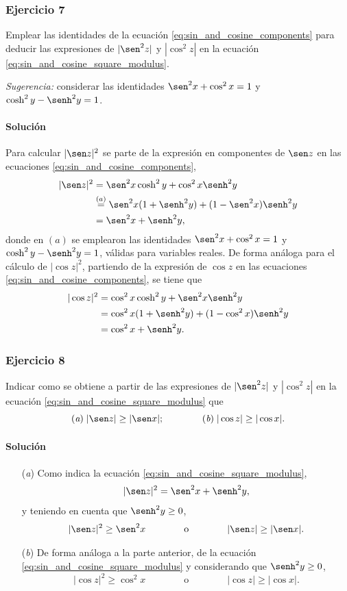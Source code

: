 \documentclass[a4paper]{report}
\begin{document}
\subsubsection{Ejercicio 7}

Emplear las identidades de la ecuación \ref{eq:sin_and_cosine_components} para deducir las expresiones de \(|\sen^2z|\) y \(|\cos^2z|\) en la ecuación \ref{eq:sin_and_cosine_square_modulus}.

\emph{Sugerencia:} considerar las identidades \(\sen^2x+\cos^2x=1\) y \(\cosh^2y-\senh^2y=1\).

\paragraph{Solución} Para calcular \(|\sen z|^2\) se parte de la expresión en componentes de \(\sen z\) en las ecuaciones \ref{eq:sin_and_cosine_components},
\begin{align*}
 |\sen z|^2&=\sen^2x\cosh^2y+\cos^2x\senh^2y\\
  &\overset{(a)}{=}\sen^2x(1+\senh^2y)+(1-\sen^2x)\senh^2y\\
  &=\sen^2x+\senh^2y,
\end{align*}
donde en \((a)\) se emplearon las identidades \(\sen^2x+\cos^2x=1\) y \(\cosh^2y-\senh^2y=1\), válidas para variables reales. De forma análoga para el cálculo de \(|\cos z|^2\), partiendo de la expresión de \(\cos z\) en las ecuaciones \ref{eq:sin_and_cosine_components}, se tiene que 
\begin{align*}
 |\cos z|^2&=\cos^2x\cosh^2y+\sen^2x\senh^2y\\
  &=\cos^2x(1+\senh^2y)+(1-\cos^2x)\senh^2y\\
  &=\cos^2x+\senh^2y.
\end{align*}

\subsubsection{Ejercicio 8}

Indicar como se obtiene a partir de las expresiones de \(|\sen^2z|\) y \(|\cos^2z|\) en la ecuación \ref{eq:sin_and_cosine_square_modulus} que 
\[
 (\textit{a})\;|\sen z|\geq|\sen x|;\qquad\qquad (\textit{b})\;|\cos z|\geq|\cos x|.
\]

\paragraph{Solución}
\begin{enumerate}
 \item[(\textit{a})] Como indica la ecuación \ref{eq:sin_and_cosine_square_modulus},
 \[
  |\sen z|^2=\sen^2x+\senh^2y,
 \]
 y teniendo en cuenta que \(\senh^2y\geq0\),
 \[
  |\sen z|^2\geq\sen^2x
  \qquad\qquad\textrm{o}\qquad\qquad
  |\sen z|\geq|\sen x|.
 \]
 \item[(\textit{b})] De forma análoga a la parte anterior, de la ecuación \ref{eq:sin_and_cosine_square_modulus} y considerando que \(\senh^2y\geq0\),
 \[
  |\cos z|^2\geq\cos^2x
  \qquad\qquad\textrm{o}\qquad\qquad
  |\cos z|\geq|\cos x|.
 \]
\end{enumerate}
\end{document}
